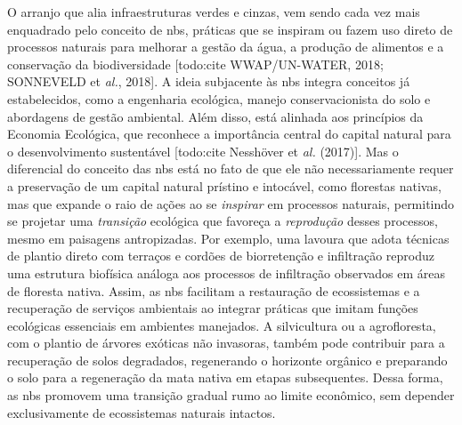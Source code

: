 \documentclass[./main.tex]{subfiles}
\begin{document}
\par O arranjo que alia infraestruturas verdes e cinzas, vem sendo cada vez mais enquadrado pelo conceito de \acrfull{nbs}, práticas que se inspiram ou fazem uso direto de processos naturais para melhorar a gestão da água, a produção de alimentos e a conservação da biodiversidade [todo:cite WWAP/UN-WATER, 2018; SONNEVELD et \textit{al.}, 2018]. A ideia subjacente às \acrshort{nbs} integra conceitos já estabelecidos, como a engenharia ecológica, manejo conservacionista do solo e abordagens de gestão ambiental. Além disso, está alinhada aos princípios da Economia Ecológica, que reconhece a importância central do capital natural para o desenvolvimento sustentável [todo:cite Nesshöver et \textit{al.} (2017)]. Mas o diferencial do conceito das \acrshort{nbs} está no fato de que ele não necessariamente requer a preservação de um capital natural prístino e intocável, como florestas nativas, mas que expande o raio de ações ao se \textit{inspirar} em processos naturais, permitindo se projetar uma \textit{transição} ecológica que favoreça a \textit{reprodução} desses processos, mesmo em paisagens antropizadas. Por exemplo, uma lavoura que adota técnicas de plantio direto com terraços e cordões de biorretenção e infiltração reproduz uma estrutura biofísica análoga aos processos de infiltração observados em áreas de floresta nativa. Assim, as \acrshort{nbs} facilitam a restauração de ecossistemas e a recuperação de serviços ambientais ao integrar práticas que imitam funções ecológicas essenciais em ambientes manejados. A silvicultura ou a agrofloresta, com o plantio de árvores exóticas não invasoras, também pode contribuir para a recuperação de solos degradados, regenerando o horizonte orgânico e preparando o solo para a regeneração da mata nativa em etapas subsequentes. Dessa forma, as \acrshort{nbs} promovem uma transição gradual rumo ao limite econômico, sem depender exclusivamente de ecossistemas naturais intactos.
\end{document}
